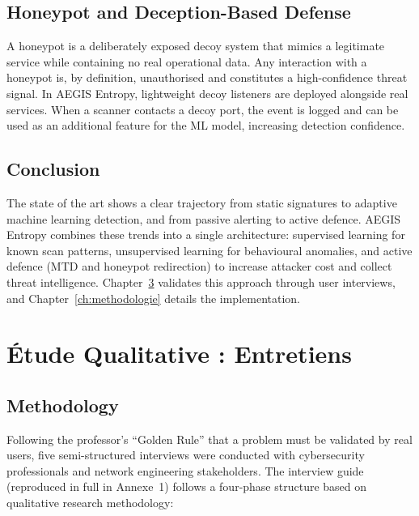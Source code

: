 \documentclass[12pt,a4paper]{report}
\begin{document}
\section{Honeypot and Deception-Based Defense}

A honeypot is a deliberately exposed decoy system that mimics a legitimate service while containing no real operational data. Any interaction with a honeypot is, by definition, unauthorised and constitutes a high-confidence threat signal. In AEGIS Entropy, lightweight decoy listeners are deployed alongside real services. When a scanner contacts a decoy port, the event is logged and can be used as an additional feature for the ML model, increasing detection confidence.

\section{Conclusion}

The state of the art shows a clear trajectory from static signatures to adaptive machine learning detection, and from passive alerting to active defence. AEGIS Entropy combines these trends into a single architecture: supervised learning for known scan patterns, unsupervised learning for behavioural anomalies, and active defence (MTD and honeypot redirection) to increase attacker cost and collect threat intelligence. Chapter~\ref{ch:qualitative} validates this approach through user interviews, and Chapter~\ref{ch:methodologie} details the implementation.

\chapter{\'{E}tude Qualitative : Entretiens}\label{ch:qualitative}

\section{Methodology}

Following the professor's ``Golden Rule'' that a problem must be validated by real users, five semi-structured interviews were conducted with cybersecurity professionals and network engineering stakeholders. The interview guide (reproduced in full in Annexe~1) follows a four-phase structure based on qualitative research methodology:
\end{document}
